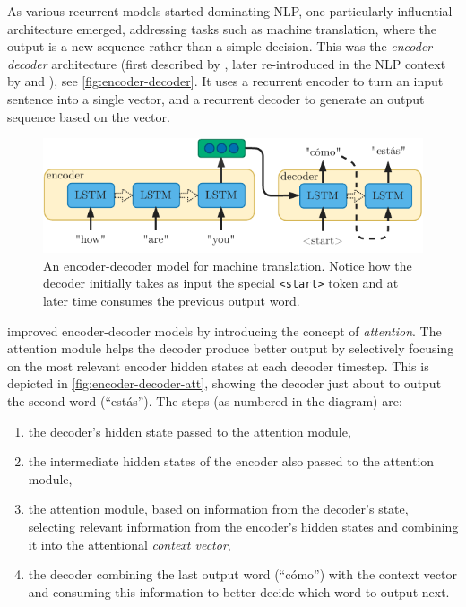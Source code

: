 \documentclass[bsc,frontabs,twoside,singlespacing,parskip,deptreport]{infthesis}
\begin{document}
{{    %
    As various recurrent models started dominating NLP, one particularly influential architecture emerged, addressing tasks such as machine translation, where the output is a new sequence rather than a simple decision. This was the \textit{encoder-decoder} architecture (first described by \citet{Hinton_1994}, later re-introduced in the NLP context by \citet{Kalchbrenner_2013} and \citet{Sutskever_2014}), see \autoref{fig:encoder-decoder}. It uses a recurrent encoder to turn an input sentence into a single vector, and a recurrent decoder to generate an output sequence based on the vector.
    \begin{figure}[h!t]
      \centering
      \includegraphics[width=11.5cm]{graphics/encoder-decoder}
      \cprotect\caption{An encoder-decoder model for machine translation. Notice how the decoder initially takes as input the special \verb|<start>| token and at later time consumes the previous output word.}
      \label{fig:encoder-decoder}
    \end{figure}

    \citet{Bahdanau_2014} improved encoder-decoder models by introducing the concept of \textit{attention}. The attention module helps the decoder produce better output by selectively focusing on the most relevant encoder hidden states at each decoder timestep. This is depicted in \autoref{fig:encoder-decoder-att}, showing the decoder just about to output the second word (``est\'as''). The steps (as numbered in the diagram) are:
    \begin{enumerate}
      \item the decoder's hidden state passed to the attention module,
      \item the intermediate hidden states of the encoder also passed to the attention module,
      \item the attention module, based on information from the decoder's state, selecting relevant information from the encoder's hidden states and combining it into the attentional \textit{context vector},
      \item the decoder combining the last output word (``c\'omo'') with the context vector and consuming this information to better decide which word to output next. 
    \end{enumerate}

}}
\end{document}
